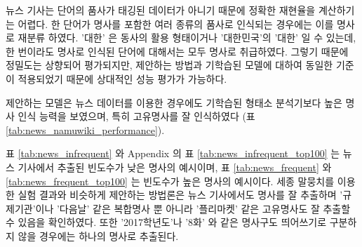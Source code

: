 \documentclass[oneside, ko,phd]{snuthesis_utf8_kor}
\begin{document}
뉴스 기사는 단어의 품사가 태깅된 데이터가 아니기 때문에 정확한 재현율을 계산하기는 어렵다.
한 단어가 명사를 포함한 여러 종류의 품사로 인식되는 경우에는 이를 명사로 재분류 하였다.
'대한' 은 동사의 활용 형태이거나 '대한민국'의 '대한' 일 수 있는데, 한 번이라도 명사로 인식된 단어에 대해서는 모두 명사로 취급하였다.
그렇기 때문에 정밀도는 상향되어 평가되지만, 제안하는 방법과 기학습된 모델에 대하여 동일한 기준이 적용되었기 때문에 상대적인 성능 평가가 가능하다.

제안하는 모델은 뉴스 데이터를 이용한 경우에도  기학습된 형태소 분석기보다 높은 명사 인식 능력을 보였으며, 특히 고유명사를 잘 인식하였다 (표 \ref{tab:news_namuwiki_performance}).

표 \ref{tab:news_infrequent} 와 Appendix 의 표 \ref{tab:news_infrequent_top100} 는 뉴스 기사에서 추출된 빈도수가 낮은 명사의 예시이며, 표 \ref{tab:news_frequent} 와 \ref{tab:news_frequent_top100} 는 빈도수가 높은 명사의 예시이다.
세종 말뭉치를 이용한 실험 결과와 비슷하게 제안하는 방법론은 뉴스 기사에서도 명사를 잘 추출하며 '규제기관'이나 '다음날' 같은 복합명사 뿐 아니라 '플리마켓' 같은 고유명사도 잘 추출할 수 있음을 확인하였다.
또한 '2017학년도'나 '8화' 와 같은 명사구도 띄어쓰기로 구분하지 않을 경우에는 하나의 명사로 추출된다.

\begin{table}[ht]
\centering
\caption{뉴스 기사에서 명사로 추출된 빈도수가 작은 12 개의 명사 예시 (로지스틱 리그레션의 판별 확률, 출현 빈도수)}
\label{tab:news_infrequent}
\end{table}

\begin{table}[ht]
\centering
\caption{뉴스 기사에서 명사로 추출된 12 개의 명사 예시 (정렬 기준 = 판별 확률 $\times$ 출현 빈도수)}
\label{tab:news_frequent}
\end{table}
\end{document}
